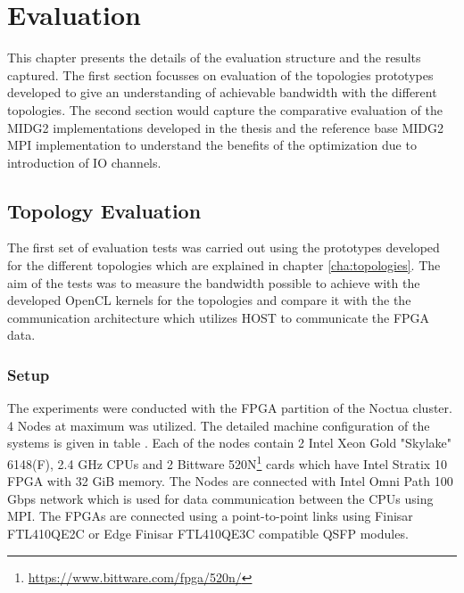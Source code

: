 \chapter{Evaluation}
\label{cha:Evaluation}

This chapter presents the details of the evaluation structure and the results
captured. The first section focusses on evaluation of the topologies prototypes
developed to give an understanding of achievable bandwidth with the different
topologies. The second section would capture the comparative evaluation of
the MIDG2 implementations developed in the thesis and the reference base MIDG2
MPI implementation to understand the benefits of the optimization due to introduction
of IO channels.

\section{Topology Evaluation}

The first set of evaluation tests was carried out using the prototypes
developed for the different topologies which are explained in chapter \ref{cha:topologies}.
The aim of the tests was to measure the bandwidth possible to achieve with the
developed OpenCL kernels for the topologies and compare it with the
the communication architecture which utilizes HOST to communicate the
FPGA data.

\subsection{Setup}

The experiments were conducted with the FPGA partition of the Noctua
cluster. 4 Nodes at maximum was utilized. The detailed machine configuration
of the systems is given in table . Each of the nodes
contain 2 Intel Xeon Gold "Skylake" 6148(F), 2.4 GHz CPUs and
2 Bittware 520N\footnote{\url{https://www.bittware.com/fpga/520n/}}
cards which have Intel Stratix 10 FPGA with 32 GiB memory. The Nodes
are connected with Intel Omni Path 100 Gbps network which is used
for data communication between the CPUs using MPI. The FPGAs
are connected using a point-to-point links using Finisar FTL410QE2C
or Edge Finisar FTL410QE3C compatible QSFP modules.

